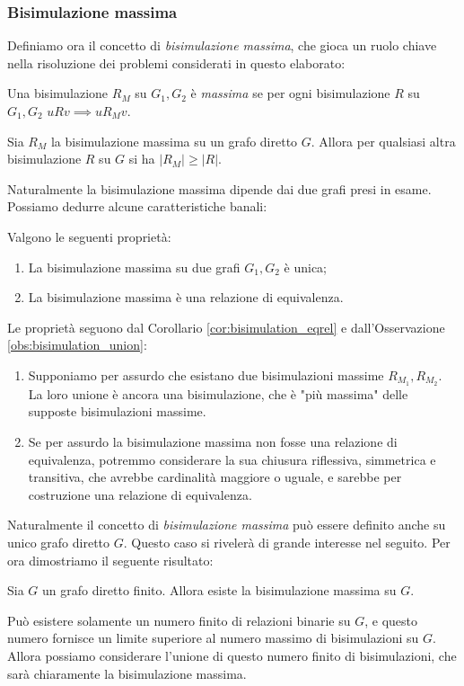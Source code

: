 \subsubsection{Bisimulazione massima}
\label{sec:bisi_max}
Definiamo ora il concetto di \emph{bisimulazione massima}, che gioca un ruolo chiave nella risoluzione dei problemi considerati in questo elaborato:
\begin{definition}
    Una bisimulazione $R_M$ su $G_1, G_2$ è \emph{massima} se per ogni bisimulazione $R$ su $G_1,G_2 \,\, u R v \implies u R_M v$.
\end{definition}
\begin{observation}
    Sia $R_M$ la bisimulazione massima su un grafo diretto $G$. Allora per qualsiasi altra bisimulazione $R$ su $G$ si ha $|R_M| \geq |R|$.
\end{observation}
Naturalmente la bisimulazione massima dipende dai due grafi presi in esame. Possiamo dedurre alcune caratteristiche banali:
\begin{proposition}
    Valgono le seguenti proprietà:
    \begin{enumerate}
        \item La bisimulazione massima su due grafi $G_1,G_2$ è unica;
        \item La bisimulazione massima è una relazione di equivalenza.
    \end{enumerate}
    \vspace*{-0.3cm}
    \label{prop:bisi_max_equi}
\end{proposition}
\begin{proof2}
    Le proprietà seguono dal Corollario \ref{cor:bisimulation_eqrel} e dall'Osservazione \ref{obs:bisimulation_union}:
    \begin{enumerate}
        \item Supponiamo per assurdo che esistano due bisimulazioni massime $R_{M_1}, R_{M_2}$. La loro unione è ancora una bisimulazione, che è "più massima" delle supposte bisimulazioni massime.
        \item Se per assurdo la bisimulazione massima non fosse una relazione di equivalenza, potremmo considerare la sua chiusura riflessiva, simmetrica e transitiva, che avrebbe cardinalità maggiore o uguale, e sarebbe per costruzione una relazione di equivalenza.
    \end{enumerate}
    \vspace*{-0.7cm}
\end{proof2}
Naturalmente il concetto di \emph{bisimulazione massima} può essere definito anche su unico grafo diretto $G$. Questo caso si rivelerà di grande interesse nel seguito. Per ora dimostriamo il seguente risultato:
\begin{theorem}
    Sia $G$ un grafo diretto finito. Allora esiste la bisimulazione massima su $G$.
\end{theorem}
\begin{proof2}
    Può esistere solamente un numero finito di relazioni binarie su $G$, e questo numero fornisce un limite superiore al numero massimo di bisimulazioni su $G$.
    Allora possiamo considerare l'unione di questo numero finito di bisimulazioni, che sarà chiaramente la bisimulazione massima.
\end{proof2}


